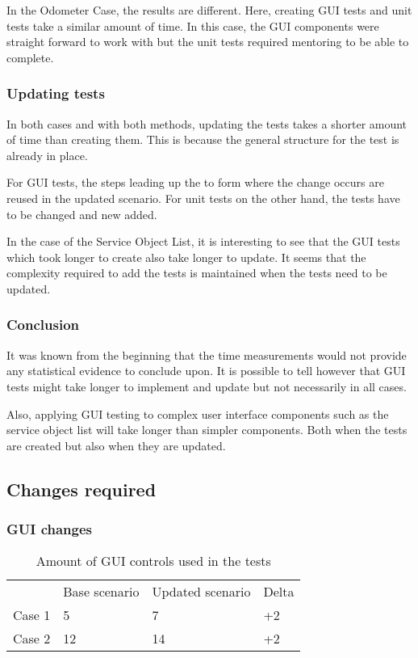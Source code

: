 \documentclass{article}
\begin{document}
 			In the Odometer Case, the results are different. Here, creating GUI tests and unit tests take a similar amount of time. In this case, the GUI components were straight forward to work with but the unit tests required mentoring to be able to complete. 

			\subsubsection{Updating tests}

			In both cases and with both methods, updating the tests takes a shorter amount of time than creating them. This is because the general structure for the test is already in place. 

			For GUI tests, the steps leading up the to form where the change occurs are reused in the updated scenario. For unit tests on the other hand, the tests have to be changed and new added. 

			In the case of the Service Object List, it is interesting to see that the GUI tests which took longer to create also take longer to update. It seems that the complexity required to add the tests is maintained when the tests need to be updated.

			\subsubsection{Conclusion}

			It was known from the beginning that the time measurements would not provide any statistical evidence to conclude upon. It is possible to tell however that GUI tests might take longer to implement and update but not necessarily in all cases. 

			Also, applying GUI testing to complex user interface components such as the service object list will take longer than simpler components. Both when the tests are created but also when they are updated. 

		\subsection{Changes required}

			\subsubsection{GUI changes}

			\begin{table}[h!]
				\begin{tabular}{l l l l}
				        & Base scenario & Updated scenario & Delta\\
				 Case 1 & 5      & 7     & +2 \\
				 Case 2 & 12     & 14    & +2 \\
				 \end{tabular}
				 \caption{Amount of GUI controls used in the tests}
			 \end{table}
\end{document}
